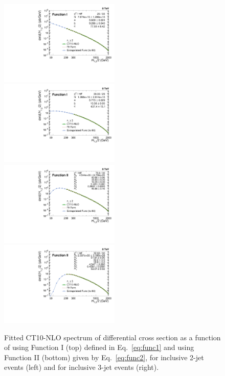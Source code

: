 \begin{figure}[h]
  \begin{center}
    \includegraphics[width=0.51\textwidth]{Plots_HT_2_150/Extrapolate_Theory_2_HT_2_150_funcI.pdf}%
    ~~\includegraphics[width=0.51\textwidth]{Plots_HT_2_150/Extrapolate_Theory_3_HT_2_150_funcI.pdf}\\
    \vspace{5mm}
    \includegraphics[width=0.51\textwidth]{Plots_HT_2_150/Extrapolate_Theory_2_HT_2_150_funcII.pdf}%
    ~~\includegraphics[width=0.51\textwidth]{Plots_HT_2_150/Extrapolate_Theory_3_HT_2_150_funcII.pdf}\\
    \caption{Fitted CT10-NLO spectrum of differential cross section as a function of \httwo using Function I (top) defined in Eq.~\ref{eq:func1} and using Function II (bottom) given by Eq.~\ref{eq:func2}, for inclusive 2-jet events (left) and for inclusive 3-jet events (right).}
    \label{fig:fit}
  \end{center}
\end{figure}


